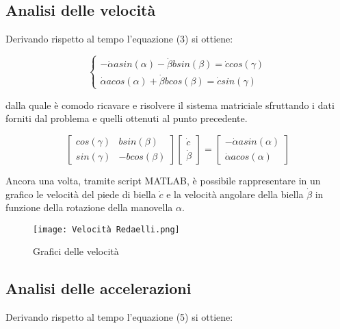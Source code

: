 \documentclass{article}
\begin{document}
\subsection{Analisi delle velocità}
Derivando rispetto al tempo l'equazione (3) si ottiene:

\begin{equation}
    \begin{cases}
        -\dot{\alpha}asin(\alpha) - \dot{\beta}bsin(\beta) = \dot{c}cos(\gamma) \\
        \dot{\alpha}acos(\alpha) + \dot{\beta}bcos(\beta) = \dot{c}sin(\gamma)
    \end{cases}
\end{equation}

dalla quale è comodo ricavare e risolvere il sistema matriciale sfruttando i dati forniti dal problema e quelli ottenuti al punto precedente.

\begin{equation}
    \begin{bmatrix}
        cos(\gamma) & bsin(\beta) \\
        sin(\gamma) & -bcos(\beta)
    \end{bmatrix}
    \begin{bmatrix}
        \dot{c} \\
        \dot{\beta}
    \end{bmatrix}
    = \begin{bmatrix}
        -\dot{\alpha}asin(\alpha) \\
        \dot{\alpha}acos(\alpha)
    \end{bmatrix}
\end{equation}

Ancora una volta, tramite script MATLAB, è possibile rappresentare in un grafico le velocità del piede di biella $\dot{c}$ e la velocità angolare della biella $\dot{\beta}$ in funzione della rotazione della manovella $\alpha$.

\begin{figure}[h!]
    \centering
    \texttt{[image: Velocità Redaelli.png]}
    \caption{Grafici delle velocità}
    \label{fig:4}
\end{figure}

\subsection{Analisi delle accelerazioni}
Derivando rispetto al tempo l'equazione (5) si ottiene:
\end{document}
